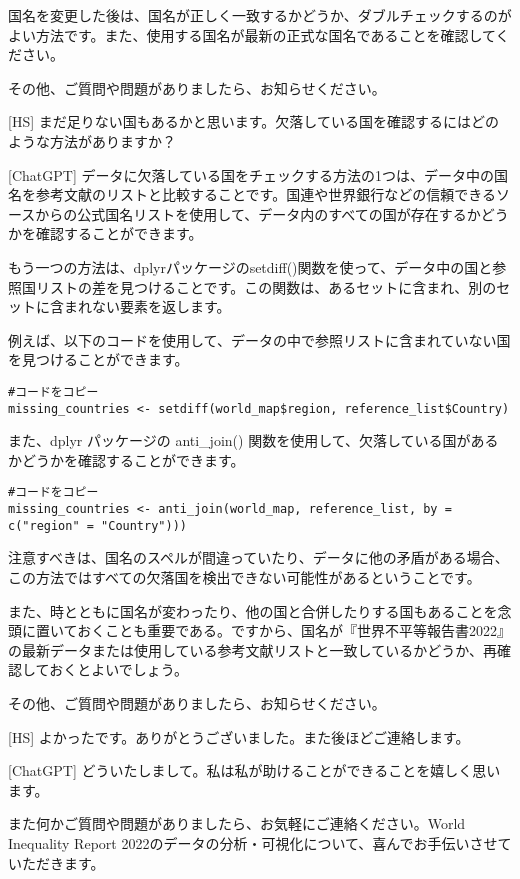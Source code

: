 \documentclass[
]{book}
\theoremstyle{definition}
\theoremstyle{definition}
\theoremstyle{definition}
\theoremstyle{definition}
\theoremstyle{remark}
\begin{document}
国名を変更した後は、国名が正しく一致するかどうか、ダブルチェックするのがよい方法です。また、使用する国名が最新の正式な国名であることを確認してください。

その他、ご質問や問題がありましたら、お知らせください。

{[}HS{]} まだ足りない国もあるかと思います。欠落している国を確認するにはどのような方法がありますか？

{[}ChatGPT{]} データに欠落している国をチェックする方法の1つは、データ中の国名を参考文献のリストと比較することです。国連や世界銀行などの信頼できるソースからの公式国名リストを使用して、データ内のすべての国が存在するかどうかを確認することができます。

もう一つの方法は、dplyrパッケージのsetdiff()関数を使って、データ中の国と参照国リストの差を見つけることです。この関数は、あるセットに含まれ、別のセットに含まれない要素を返します。

例えば、以下のコードを使用して、データの中で参照リストに含まれていない国を見つけることができます。

\begin{verbatim}
#コードをコピー
missing_countries <- setdiff(world_map$region, reference_list$Country)
\end{verbatim}

また、dplyr パッケージの anti\_join() 関数を使用して、欠落している国があるかどうかを確認することができます。

\begin{verbatim}
#コードをコピー
missing_countries <- anti_join(world_map, reference_list, by = c("region" = "Country")))
\end{verbatim}

注意すべきは、国名のスペルが間違っていたり、データに他の矛盾がある場合、この方法ではすべての欠落国を検出できない可能性があるということです。

また、時とともに国名が変わったり、他の国と合併したりする国もあることを念頭に置いておくことも重要である。ですから、国名が『世界不平等報告書2022』の最新データまたは使用している参考文献リストと一致しているかどうか、再確認しておくとよいでしょう。

その他、ご質問や問題がありましたら、お知らせください。

{[}HS{]} よかったです。ありがとうございました。また後ほどご連絡します。

{[}ChatGPT{]} どういたしまして。私は私が助けることができることを嬉しく思います。

また何かご質問や問題がありましたら、お気軽にご連絡ください。World Inequality Report 2022のデータの分析・可視化について、喜んでお手伝いさせていただきます。
\end{document}
